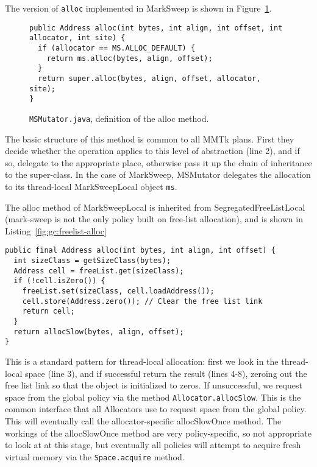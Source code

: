 The version of \lstinline|alloc| implemented in MarkSweep is shown in
Figure~\ref{fig:gc:ms-alloc}.
\begin{figure}[h!]
\begin{lstlisting}
public Address alloc(int bytes, int align, int offset, int allocator, int site) {
  if (allocator == MS.ALLOC_DEFAULT) {
    return ms.alloc(bytes, align, offset);
  }
  return super.alloc(bytes, align, offset, allocator, site);
}
\end{lstlisting}
\caption{\lstinline|MSMutator.java|, definition of the alloc method.}
\label{fig:gc:ms-alloc}
\end{figure}
The basic structure of this method is common to all MMTk plans.  
First they decide whether the operation applies to this level of abstraction 
(line 2), and if so, delegate to the
appropriate place, otherwise pass it up the chain of inheritance to the
super-class.
In the case of MarkSweep, MSMutator delegates the allocation to its thread-local 
MarkSweepLocal object \lstinline|ms|.

The alloc method of MarkSweepLocal is inherited from SegregatedFreeListLocal 
(mark-sweep is not the only policy built on free-list allocation), and is shown
in Listing~\ref{fig:gc:freelist-alloc} 
\begin{lstlisting}[name=SegregatedFreeListLocal.java,
caption=\lstname: definition of the alloc method.,label=fig:gc:freelist-alloc]
public final Address alloc(int bytes, int align, int offset) { 
  int sizeClass = getSizeClass(bytes);
  Address cell = freeList.get(sizeClass);
  if (!cell.isZero()) {
    freeList.set(sizeClass, cell.loadAddress());
    cell.store(Address.zero()); // Clear the free list link
    return cell;
  }
  return allocSlow(bytes, align, offset);
}
\end{lstlisting}
This is a standard pattern for thread-local allocation: 
first we look in the thread-local space (line 3), 
and if successful return the result (lines 4-8), zeroing out the free list link
so that the object is initialized to zeros.
If unsuccessful, we request space from the global policy via the method
\lstinline|Allocator.allocSlow|.
This is the common interface that all Allocators use to request space from the global policy.  
This will eventually call the allocator-specific allocSlowOnce method.  
The workings of the allocSlowOnce method are very policy-specific, 
so not appropriate to look at at this stage, but eventually all policies will 
attempt to acquire fresh virtual memory via the \lstinline|Space.acquire|
method.

